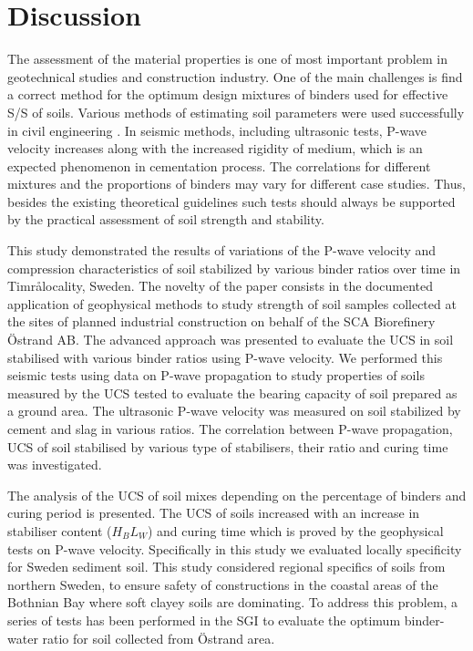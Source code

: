 \documentclass[10pt,twoside,twocolumn,a4paper]{article}
\begin{document}
\section{Discussion}

The assessment of the material properties is one of most important problem in geotechnical studies and construction industry. One of the main challenges is find a correct method for the optimum design mixtures of binders used for effective S/S of soils. Various methods of estimating soil parameters were used successfully in civil engineering \cite{Wuetal2021,Grabiec,Lemenkov2021c,Bahar}. In seismic methods, including ultrasonic tests, P-wave velocity increases along with the increased rigidity of medium, which is an expected phenomenon in cementation process. The correlations for different mixtures and the proportions of binders may vary for different case studies. Thus, besides the existing theoretical guidelines such tests should always be supported by the practical assessment of soil strength and stability.

This study demonstrated the results of variations of the P-wave velocity and compression characteristics of soil stabilized by various binder ratios over time in Timr\aa \@ locality, Sweden. The novelty of the paper consists in the documented application of geophysical methods to study strength of soil samples collected at the sites of planned industrial construction on behalf of the SCA Biorefinery \"Ostrand AB. The advanced approach was presented to evaluate the UCS in soil stabilised with various binder ratios using P-wave velocity. We performed this seismic tests using data on P-wave propagation to study properties of soils measured by the UCS tested to evaluate the bearing capacity of soil prepared as a ground area. The ultrasonic P-wave velocity was measured on soil stabilized by cement and slag in various ratios. The correlation between P-wave propagation, UCS of soil stabilised by various type of stabilisers, their ratio and curing time was investigated. 

The analysis of the UCS of soil mixes depending on the percentage of binders and curing period is presented. The UCS of soils increased with an increase in stabiliser content ($H_BL_W$) and curing time which is proved by the geophysical tests on P-wave velocity. Specifically in this study we evaluated locally specificity for Sweden sediment soil. This study considered regional specifics of soils from northern Sweden, to ensure safety of constructions in the coastal areas of the Bothnian Bay where soft clayey soils are dominating. To address this problem, a series of tests has been performed in the SGI to evaluate the optimum binder-water ratio for soil collected from \"Ostrand area.
\end{document}
